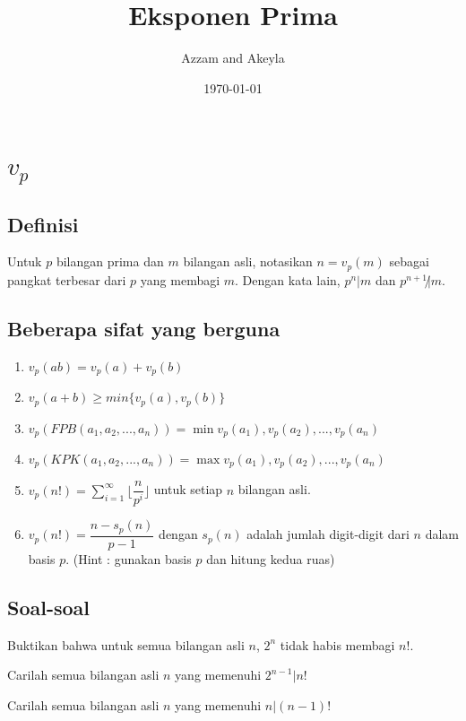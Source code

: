 \documentclass[11pt]{scrartcl}
\title{Eksponen Prima}
\author{Azzam and Akeyla}
\date{\today}
\begin{document}
\maketitle

\renewcommand*\contentsname{Daftar Isi}
\tableofcontents

\newpage
\section{$v_p$}
\subsection{Definisi}
Untuk $p$ bilangan prima dan $m$ bilangan asli, notasikan $n = v_p(m)$ sebagai pangkat terbesar dari $p$ yang membagi $m$. Dengan kata lain, $p^n | m$ dan $p^{n + 1} \not| m$.
\subsection{Beberapa sifat yang berguna}
\begin{enumerate}
    \item $v_p(ab) = v_p(a) + v_p(b)$
    \item $v_p(a + b) \geq min\{v_p(a), v_p(b)\}$
    \item $v_p(FPB(a_1, a_2,..., a_n)) = \min{v_p(a_1), v_p(a_2),..., v_p(a_n)}$
    \item $v_p(KPK(a_1, a_2,..., a_n)) = \max{v_p(a_1), v_p(a_2),..., v_p(a_n)}$
    \item $v_p(n!) = \sum_{i = 1}^{\infty} \bigg\lfloor{\dfrac{n}{p^i}}\bigg\rfloor$ untuk setiap $n$ bilangan asli.
    \item $v_p(n!) = \dfrac{n - s_p(n)}{p - 1}$ dengan $s_p(n)$ adalah jumlah digit-digit dari $n$ dalam basis $p$. (Hint : gunakan basis $p$ dan hitung kedua ruas)
\end{enumerate}
\subsection{Soal-soal}
\begin{problem}
    Buktikan bahwa untuk semua bilangan asli $n$, $2^n$ tidak habis membagi $n!$.
\end{problem}

\begin{problem}
    Carilah semua bilangan asli $n$ yang memenuhi $2^{n - 1} | n!$
\end{problem}

\begin{problem}
    Carilah semua bilangan asli $n$ yang memenuhi $n| (n - 1)!$    
\end{problem}
\end{document}
